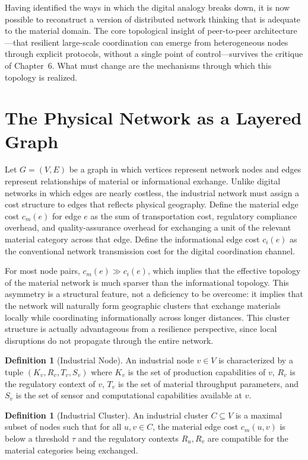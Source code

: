 \documentclass[12pt]{book}
\theoremstyle{definition}
\newtheorem{definition}[theorem]{Definition}
\theoremstyle{remark}
\begin{document}
Having identified the ways in which the digital analogy breaks down,
it is now possible to reconstruct a version of distributed network
thinking that is adequate to the material domain. The core
topological insight of peer-to-peer architecture---that resilient
large-scale coordination can emerge from heterogeneous nodes through
explicit protocols, without a single point of control---survives the
critique of Chapter~6. What must change are the mechanisms through
which this topology is realized.

\section{The Physical Network as a Layered Graph}

Let $G = (V, E)$ be a graph in which vertices represent network nodes
and edges represent relationships of material or informational
exchange. Unlike digital networks in which edges are nearly costless,
the industrial network must assign a cost structure to edges that
reflects physical geography. Define the material edge cost
$c_m(e)$ for edge $e$ as the sum of transportation cost, regulatory
compliance overhead, and quality-assurance overhead for exchanging
a unit of the relevant material category across that edge. Define the
informational edge cost $c_i(e)$ as the conventional network
transmission cost for the digital coordination channel.

For most node pairs, $c_m(e) \gg c_i(e)$, which implies that the
effective topology of the material network is much sparser than the
informational topology. This asymmetry is a structural feature, not
a deficiency to be overcome: it implies that the network will
naturally form geographic clusters that exchange materials locally
while coordinating informationally across longer distances. This
cluster structure is actually advantageous from a resilience
perspective, since local disruptions do not propagate through
the entire network.

\begin{definition}[Industrial Node]
An industrial node $v \in V$ is characterized by a tuple
$(K_v, R_v, T_v, S_v)$ where $K_v$ is the set of production
capabilities of $v$, $R_v$ is the regulatory context of $v$,
$T_v$ is the set of material throughput parameters, and $S_v$ is
the set of sensor and computational capabilities available at $v$.
\end{definition}

\begin{definition}[Industrial Cluster]
An industrial cluster $C \subseteq V$ is a maximal subset of nodes
such that for all $u, v \in C$, the material edge cost $c_m(u,v)$
is below a threshold $\tau$ and the regulatory contexts $R_u, R_v$
are compatible for the material categories being exchanged.
\end{definition}
\end{document}
